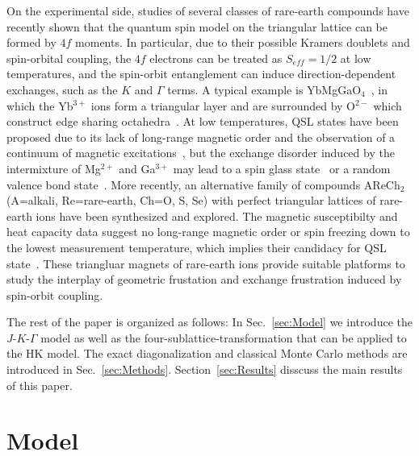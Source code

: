 \documentclass[aps,prb,reprint,amsfonts,amsmath,amssymb,showpacs,groupedaddress,superscriptaddress]{revtex4-1}
\begin{document}
On the experimental side, studies of several classes of rare-earth compounds have recently shown that the quantum spin model on the triangular lattice can be formed by $4f$ moments. In particular, due to their possible Kramers doublets and spin-orbital coupling, the $4f$ electrons can be treated as $S_{eff}=1/2$ at low temperatures, and the spin-orbit entanglement can induce direction-dependent exchanges, such as the $K$ and $\Gamma$ terms. A typical example is YbMgGaO$_{4}$~\cite{srep16419,PhysRevLett.115.167203,PhysRevLett.117.097201,nphys3971,Nature20614,PhysRevLett.117.267202,PhysRevLett.120.087201,PhysRevLett.122.137201,LiAdroja-398}, in which the Yb$^{3+}$ ions form a triangular layer and are surrounded by O$^{2-}$ which construct edge sharing octahedra~\cite{srep16419,PhysRevLett.115.167203}. At low temperatures, QSL states have been proposed due to its lack of long-range magnetic order and the observation of a continuum of magnetic excitations~\cite{srep16419,PhysRevLett.115.167203,PhysRevLett.117.097201,nphys3971,Nature20614}, but the exchange disorder induced by the intermixture of Mg$^{2+}$ and Ga$^{3+}$ may lead to a spin glass state~\cite{PhysRevLett.120.087201} or a random valence bond state~\cite{PhysRevLett.122.137201,LiAdroja-398}. More recently, an alternative family of compounds AReCh$_2$ (A=alkali, Re=rare-earth, Ch=O, S, Se) with perfect triangular lattices of rare-earth ions have been synthesized and explored. The magnetic susceptibilty and heat capacity data suggest no long-range magnetic order or spin freezing down to the lowest measurement temperature, which implies their candidacy for QSL state~\cite{acsmaterialslett.9b00464,PhysRevMaterials.3.114413,arXiv1911.08036,Liu_2018,PhysRevB.99.180401,PhysRevB.100.224417,PhysRevB.100.144432}. These triangluar magnets of rare-earth ions provide suitable platforms to study the interplay of geometric frustation and exchange frustration induced by spin-orbit coupling.

{
    \color{red}The rest of the paper is organized as follows: In Sec.~\ref{sec:Model} we introduce the $J$-$K$-$\Gamma$ model as well as the four-sublattice-transformation that can be applied to the HK model. The exact diagonalization and classical Monte Carlo methods are introduced in Sec.~\ref{sec:Methods}. Section~\ref{sec:Results} disscuss the main results of this paper.
}

\section{\label{sec:Model}Model}
\end{document}

